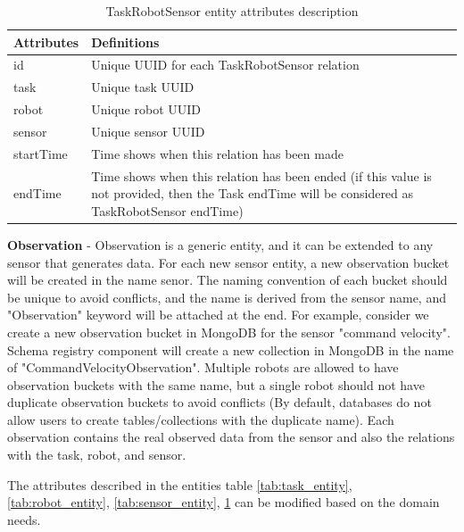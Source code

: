 	\begin{table}[!htbp]
		\begin{tabular}{|l|p{12cm}|}
			\hline
			\textbf{Attributes} & \textbf{Definitions} \\ \hline

			id &  Unique UUID for each TaskRobotSensor relation \\ \hline			
			task & Unique task UUID \\ \hline
			robot & Unique robot UUID \\ \hline
			sensor & Unique sensor UUID \\ \hline
			startTime & Time shows when this relation has been made \\ \hline
			endTime & Time shows when this relation has been ended (if this value is not provided, then the Task endTime will be considered as TaskRobotSensor endTime) \\ \hline
			
		\end{tabular}
		\caption{TaskRobotSensor entity attributes description}
		\label{tab:TaskRobotSensor}
	\end{table}

	\textbf{Observation} - Observation is a generic entity, and it can be extended to any sensor that generates data. For each new sensor entity, a new observation bucket will be created in the name senor. The naming convention of each bucket should be unique to avoid conflicts, and the name is derived from the sensor name, and "Observation" keyword will be attached at the end. For example, consider we create a new observation bucket in MongoDB for the sensor "command velocity". Schema registry component will create a new collection in MongoDB in the name of "CommandVelocityObservation". Multiple robots are allowed to have observation buckets with the same name, but a single robot should not have duplicate observation buckets to avoid conflicts (By default, databases do not allow users to create tables/collections with the duplicate name). Each observation contains the real observed data from the sensor and also the relations with the task, robot, and sensor.

	The attributes described in the entities table \ref{tab:task_entity}, \ref{tab:robot_entity}, \ref{tab:sensor_entity}, \ref{tab:TaskRobotSensor} can be modified based on the domain needs.
	
